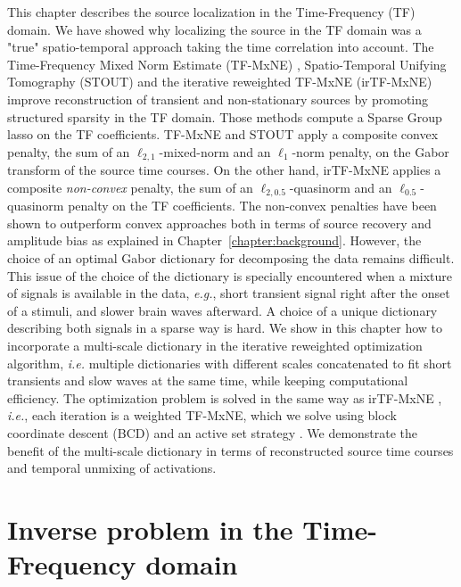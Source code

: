 This chapter describes the source localization in the Time-Frequency (TF) domain. We have showed why localizing the source in the TF domain was a "true" spatio-temporal approach taking the time correlation into account.
The Time-Frequency Mixed Norm Estimate (TF-MxNE) \cite{Alex13}, Spatio-Temporal Unifying Tomography (STOUT) \cite{castano2015solving} and the iterative reweighted TF-MxNE (irTF-MxNE) \cite{daniel15} improve reconstruction of transient and non-stationary sources by promoting structured sparsity in the TF domain. Those methods compute a Sparse Group \ac{lasso} on the TF coefficients. TF-MxNE and STOUT apply a composite convex penalty, the sum of an $\ell_{2, 1}$-mixed-norm and an $\ell_{1}$-norm penalty, on the Gabor transform of the source time courses. On the other hand, irTF-MxNE applies a composite \emph{non-convex} penalty, the sum of an $\ell_{2, 0.5}$-quasinorm and an $\ell_{0.5}$-quasinorm penalty on the TF coefficients.
The non-convex penalties have been shown to outperform convex approaches both in terms of source recovery and amplitude bias \cite{candes2008enhancing,daubechies2010iteratively} as explained in Chapter~\ref{chapter:background}. However, the choice of an optimal Gabor dictionary for decomposing the data remains difficult.\\

This issue of the choice of the dictionary is specially encountered when a mixture of signals is available in the data, \textit{e.g.}, short transient signal right after the onset of a stimuli, and slower brain waves afterward. A choice of a unique dictionary describing both signals in a sparse way is hard. We show in this chapter how to incorporate a multi-scale dictionary in the iterative reweighted optimization algorithm, \textit{i.e.} multiple dictionaries with different scales concatenated to fit short transients and slow waves at the same time, while keeping computational efficiency. The optimization problem is solved in the same way as irTF-MxNE \cite{daniel15}, \textit{i.e.}, each iteration is a weighted TF-MxNE, which we solve using block coordinate descent (BCD) and an active set strategy \cite{friedman2010regularization}. %
We demonstrate the benefit of the multi-scale dictionary in terms of reconstructed source time courses and temporal unmixing of activations.

\section{Inverse problem in the Time-Frequency domain} \label{irtfmxne}

